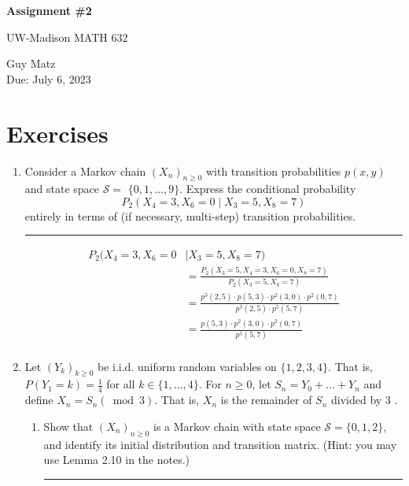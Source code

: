 \documentclass{article} %
\theoremstyle{plain}
\theoremstyle{case}
\begin{document}
\begin{center}
\Large{\textbf{Assignment \#2}
            
UW-Madison MATH 632} %
\vspace{5pt}
        
\normalsize{  Guy Matz%
        \\ Due: July 6, 2023}
\vspace{15pt}
\end{center}

\section*{Exercises}%
\begin{enumerate}[label={\fbox{\textbf{Exercise \#\arabic* :}}}]
  \item Consider a Markov chain $\left(X_n\right)_{n \geq 0}$ with transition probabilities $p(x, y)$ and state space $\mathcal{S}=$ $\{0,1, \ldots, 9\}$. Express the conditional probability
$$
P_2\left(X_4=3, X_6=0 \mid X_3=5, X_8=7\right)
$$
entirely in terms of (if necessary, multi-step) transition probabilities.
\par\noindent\rule{\textwidth}{0.1pt}
  \begin{align*}
    P_2(X_4=3, X_6=0 &\mid X_3=5, X_8=7) \\
\qquad      &=\frac{P_2(X_3=5, X_4=3, X_6=0 ,X_8=7) }
          {P_2(X_3=5, X_8=7)} \\
\qquad      &=\frac{p^3(2,5) \cdot p(5,3) \cdot p^2(3,0) \cdot p^2(0,7) }
          {p^3(2,5) \cdot p^5(5,7) } \\
\qquad      &=\frac {p(5,3) \cdot p^2(3,0) \cdot p^2(0,7) }
          {p^5(5,7) } \\
  \end{align*}

\newpage

  \item Let $\left(Y_k\right)_{k \geq 0}$ be i.i.d. uniform random variables on $\{1,2,3,4\}$. That is, $P\left(Y_1=k\right)=\frac{1}{4}$ for all $k \in\{1, \ldots, 4\}$. For $n \geq 0$, let $S_n=Y_0+\ldots+Y_n$ and define $X_n=S_n(\bmod 3)$. That is, $X_n$ is the remainder of $S_n$ divided by 3 .
    \begin{enumerate}
      \item  Show that $\left(X_n\right)_{n \geq 0}$ is a Markov chain with state space $\mathcal{S}=\{0,1,2\}$, and identify its initial distribution and transition matrix. (Hint: you may use Lemma 2.10 in the notes.)
\par\noindent\rule{\textwidth}{0.1pt}


\end{enumerate}
\end{enumerate}
\end{document}
